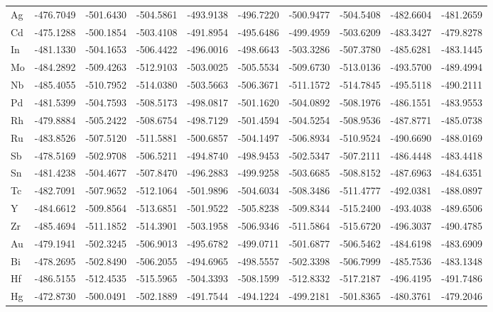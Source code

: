 \begin{table}[htbp]
{\begin{tabular}{l *{9}{l}}
      Ag & -476.7049 & -501.6430 & -504.5861 & -493.9138 & -496.7220 & -500.9477 & -504.5408 & -482.6604 & -481.2659 \\
      Cd & -475.1288 & -500.1854 & -503.4108 & -491.8954 & -495.6486 & -499.4959 & -503.6209 & -483.3427 & -479.8278 \\
      In & -481.1330 & -504.1653 & -506.4422 & -496.0016 & -498.6643 & -503.3286 & -507.3780 & -485.6281 & -483.1445 \\
      Mo & -484.2892 & -509.4263 & -512.9103 & -503.0025 & -505.5534 & -509.6730 & -513.0136 & -493.5700 & -489.4994 \\
      Nb & -485.4055 & -510.7952 & -514.0380 & -503.5663 & -506.3671 & -511.1572 & -514.7845 & -495.5118 & -490.2111 \\
      Pd & -481.5399 & -504.7593 & -508.5173 & -498.0817 & -501.1620 & -504.0892 & -508.1976 & -486.1551 & -483.9553 \\
      Rh & -479.8884 & -505.2422 & -508.6754 & -498.7129 & -501.4594 & -504.5254 & -508.9536 & -487.8771 & -485.0738 \\
      Ru & -483.8526 & -507.5120 & -511.5881 & -500.6857 & -504.1497 & -506.8934 & -510.9524 & -490.6690 & -488.0169 \\
      Sb & -478.5169 & -502.9708 & -506.5211 & -494.8740 & -498.9453 & -502.5347 & -507.2111 & -486.4448 & -483.4418 \\
      Sn & -481.4238 & -504.4677 & -507.8470 & -496.2883 & -499.9258 & -503.6685 & -508.8152 & -487.6963 & -484.6351 \\
      Tc & -482.7091 & -507.9652 & -512.1064 & -501.9896 & -504.6034 & -508.3486 & -511.4777 & -492.0381 & -488.0897 \\
      Y  & -484.6612 & -509.8564 & -513.6851 & -501.9522 & -505.8238 & -509.8344 & -515.2400 & -493.4038 & -489.6506 \\
      Zr & -485.4694 & -511.1852 & -514.3901 & -503.1958 & -506.9346 & -511.5864 & -515.6720 & -496.3037 & -490.4785 \\
      Au & -479.1941 & -502.3245 & -506.9013 & -495.6782 & -499.0711 & -501.6877 & -506.5462 & -484.6198 & -483.6909 \\
      Bi & -478.2695 & -502.8490 & -506.2055 & -494.6965 & -498.5557 & -502.3398 & -506.7999 & -485.7536 & -483.1348 \\
      Hf & -486.5155 & -512.4535 & -515.5965 & -504.3393 & -508.1599 & -512.8332 & -517.2187 & -496.4195 & -491.7486 \\
      Hg & -472.8730 & -500.0491 & -502.1889 & -491.7544 & -494.1224 & -499.2181 & -501.8365 & -480.3761 & -479.2046 \\

\end{tabular}}
\end{table}

